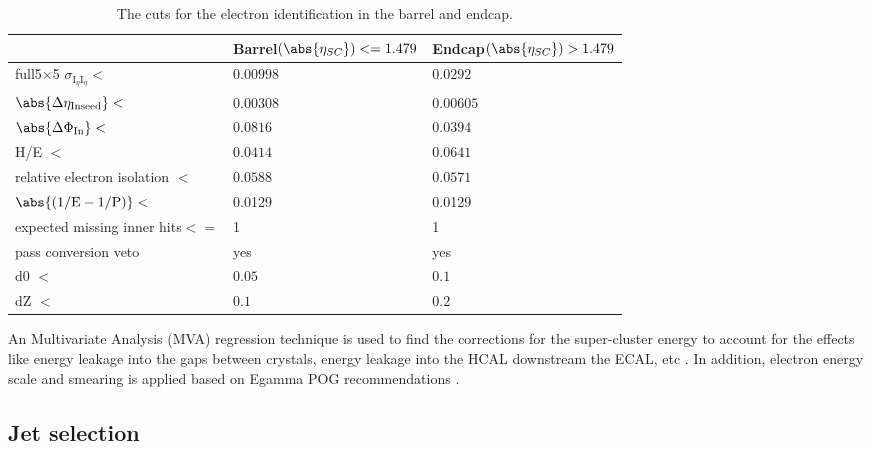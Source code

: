 \begin{table}[!h]
\begin{center}
\begin{tabular}{lll}
\hline\hline
                & Barrel$(\abs{\eta_{SC} })<=1.479 $& Endcap$(\abs{\eta_{SC} })>1.479 $  \\
\hline
full5$\times$5 $\sigma_{\mathrm{I}_{\eta} \mathrm{I}_{\eta}} < $ & $0.00998$ & $0.0292$ \\
$\abs {\Delta\eta_{\mathrm{Inseed}}}<$ & $0.00308$ & $0.00605$ \\
$\abs{\Delta \Phi_{\mathrm{In}}}<$ &$0.0816$ &$0.0394$ \\
H/E $<$& $0.0414$ & $0.0641$ \\
relative electron isolation $<$& $0.0588$&$0.0571$\\
$\abs{\mathrm{(1/E-1/P)}}<$ &0.0129&0.0129\\
expected missing inner hits$<=$&1 &1\\
pass conversion veto & yes& yes \\
d0 $<$&  $0.05$ & $0.1$ \\
dZ $<$&  $0.1 $ & $0.2$ \\
\hline
\end{tabular}
\caption{  The cuts for the electron identification in the barrel and endcap.}
\label{Tab.electrontightidentification}
\end{center}
\end{table}


An Multivariate Analysis (MVA) regression technique is used to find the corrections for the super-cluster energy to account for the effects like energy leakage into the gaps between crystals, energy leakage into the HCAL downstream the ECAL, etc \cite{Khachatryan:2015hwa}. In addition, electron energy scale and smearing is applied  based on Egamma POG recommendations \cite{elescale}.



\subsection{Jet selection}

